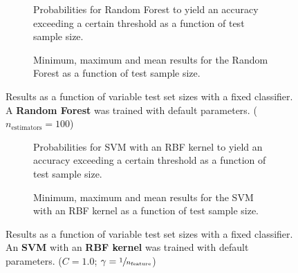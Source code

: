 \begin{figure}
    \captionsetup[subfigure]{justification=justified,singlelinecheck=false}
    \begin{subfigure}[t]{0.61\textwidth}
        
        \caption{Probabilities for Random Forest to yield an accuracy exceeding a certain threshold as a function of test sample size.}
    \end{subfigure}
    \hspace{3.0mm}
    \begin{subfigure}[t]{0.34\textwidth}
        
        \caption{Minimum, maximum and mean results for the Random Forest as a function of test sample size.}
    \end{subfigure}
    \caption[Effects of varying test sample size. Random Forest; No preprocessing]{Results as a function of variable test set sizes with a fixed classifier. A \textbf{{Random Forest}} was trained with default parameters. ($n_\text{estimators}=\num{100}$)}
    \label{fig:no_PCA_no_selection_RandomForest}
\end{figure}

\begin{figure}
    \captionsetup[subfigure]{justification=justified,singlelinecheck=false}
    \begin{subfigure}[t]{0.61\textwidth}
        
        \caption{Probabilities for SVM with an RBF kernel to yield an accuracy exceeding a certain threshold as a function of test sample size.}
    \end{subfigure}
    \hspace{3.0mm}
    \begin{subfigure}[t]{0.34\textwidth}
        
        \caption{Minimum, maximum and mean results for the SVM with an RBF kernel as a function of test sample size.}
    \end{subfigure}
    \caption[Effects of varying test sample size. SVM (kernel = RBF); No preprocessing]{Results as a function of variable test set sizes with a fixed classifier. An \textbf{{SVM}} with an \textbf{{RBF kernel}} was trained with default parameters. ($C=\num{1.0}$; $\gamma=\sfrac{1}{n_\text{feature}}$)}
    \label{fig:no_PCA_no_selection_SVC}
\end{figure}

